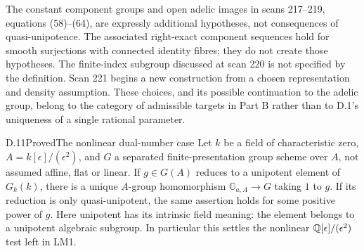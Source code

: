 The constant component groups and open adelic images in scans
217--219, equations (58)--(64), are expressly additional hypotheses,
not consequences of quasi-unipotence.  The associated right-exact
component sequences hold for smooth surjections with connected
identity fibres; they do not create those hypotheses.  The
finite-index subgroup discussed at scan 220 is not specified by
the definition.  Scan 221 begins a new construction from a chosen
representation and density assumption.  These choices, and its
possible continuation to the adelic group, belong to the category
of admissible targets in Part B rather than to D.1's uniqueness
of a single rational parameter.

\begin{statement}{D.11}{Proved}{The nonlinear dual-number case}
Let $k$ be a field of characteristic zero,
$A=k[\epsilon]/(\epsilon^2)$, and $G$ a separated
finite-presentation group scheme over $A$, not assumed
affine, flat or linear. If $g\in G(A)$ reduces to a
unipotent element of $G_k(k)$, there is a unique
$A$-group homomorphism $\mathbb G_{a,A}\to G$ taking $1$ to $g$.
If its reduction is only quasi-unipotent, the same
assertion holds for some positive power of $g$.
Here unipotent has its intrinsic field meaning:
the element belongs to a unipotent algebraic subgroup.
In particular this settles the nonlinear
$\mathbb Q[\epsilon]/(\epsilon^2)$ test left in LM1.
\end{statement}
